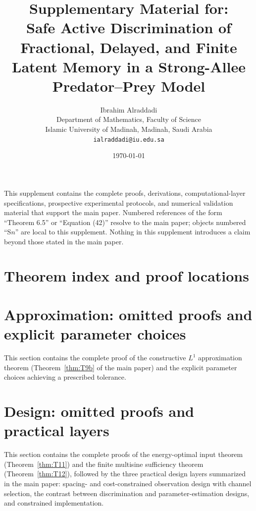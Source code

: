 \documentclass[9pt]{extarticle}
\title{Supplementary Material for:\\
Safe Active Discrimination of Fractional, Delayed, and Finite Latent Memory in a Strong-Allee Predator--Prey Model}
\author{Ibrahim Alraddadi\\
Department of Mathematics, Faculty of Science\\
Islamic University of Madinah, Madinah, Saudi Arabia\\
\texttt{ialraddadi@iu.edu.sa}}
\date{\today}
\begin{document}
\maketitle

\noindent This supplement contains the complete proofs, derivations, computational-layer
specifications, prospective experimental protocols, and numerical validation material that
support the main paper. Numbered references of the form ``Theorem 6.5'' or ``Equation (42)''
resolve to the main paper; objects numbered ``S$n$'' are local to this supplement. Nothing
in this supplement introduces a claim beyond those stated in the main paper.

\theoremstyle{plain}
\newtheorem{theorem}{Theorem}[section]
\newtheorem{lemma}[theorem]{Lemma}
\newtheorem{corollary}[theorem]{Corollary}
\theoremstyle{definition}
\newtheorem{definition}[theorem]{Definition}
\theoremstyle{remark}
\newtheorem{remark}[theorem]{Remark}

\section{Theorem index and proof locations}
\label{ssec:index}



\section{Approximation: omitted proofs and explicit parameter choices}
\label{ssec:approx}

This section contains the complete proof of the constructive $L^1$ approximation theorem
(Theorem~\ref{thm:T9b} of the main paper) and the explicit parameter choices achieving a
prescribed tolerance.



\section{Design: omitted proofs and practical layers}
\label{ssec:design}

This section contains the complete proofs of the energy-optimal input theorem
(Theorem~\ref{thm:T11}) and the finite multisine sufficiency theorem (Theorem~\ref{thm:T12}),
followed by the three practical design layers summarized in the main paper: spacing- and
cost-constrained observation design with channel selection, the contrast between
discrimination and parameter-estimation designs, and constrained implementation.
\end{document}
